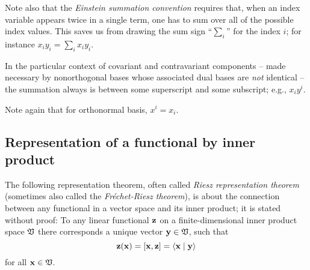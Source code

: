 Note also that the {\em Einstein summation convention}
requires that, when an index variable appears twice in a single term, one has to
sum over all of the possible index values.
This saves us from drawing the sum sign ``$\sum_i$'' for the index $i$;
for instance $x_iy_i =\sum_{i}x_iy_i$.

In the particular context of covariant and contravariant components
--
made necessary by nonorthogonal bases whose associated dual bases are {\em not} identical
--
the summation always is between some superscript and some subscript;
e.g., $x_iy^i$.

Note again that for orthonormal basis,
$x^i=x_i$.


\subsection{Representation of a functional by inner product}
\label{2011-m-corr-bil-ip}
The following representation theorem,
often called
{\em Riesz representation theorem}
(sometimes also called the {\em Fr\'echet-Riesz theorem}),
is about the connection between any functional
in a vector space and its inner product; it is stated without proof:
To any linear functional ${\bf z}$
on a finite-dimensional inner product space ${\frak V}$
there corresponds a unique vector   ${\bf y}\in {\frak V}$,
such that
\begin{equation}
{\bf z} ({\bf x}) =[{\bf x}, {\bf z}]= \langle {\bf x}\mid {\bf y}\rangle
\label{2015-m-ch-fdlvs-e1}
\end{equation}
for all ${\bf x}\in {\frak V}$.

